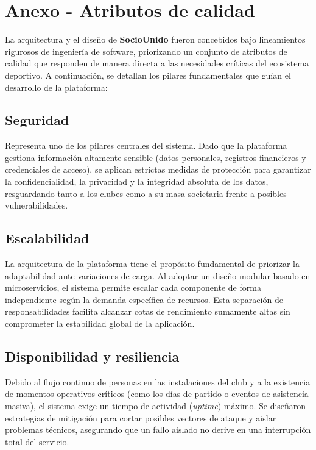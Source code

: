 \section{Anexo - Atributos de calidad}

La arquitectura y el diseño de \textbf{SocioUnido} fueron concebidos bajo lineamientos rigurosos de ingeniería de software, priorizando un conjunto de atributos de calidad que responden de manera directa a las necesidades críticas del ecosistema deportivo. A continuación, se detallan los pilares fundamentales que guían el desarrollo de la plataforma:

\subsection{Seguridad}

Representa uno de los pilares centrales del sistema. Dado que la plataforma gestiona información altamente sensible (datos personales, registros financieros y credenciales de acceso), se aplican estrictas medidas de protección para garantizar la confidencialidad, la privacidad y la integridad absoluta de los datos, resguardando tanto a los clubes como a su masa societaria frente a posibles vulnerabilidades.

\subsection{Escalabilidad}

La arquitectura de la plataforma tiene el propósito fundamental de priorizar la adaptabilidad ante variaciones de carga. Al adoptar un diseño modular basado en microservicios, el sistema permite escalar cada componente de forma independiente según la demanda específica de recursos. Esta separación de responsabilidades facilita alcanzar cotas de rendimiento sumamente altas sin comprometer la estabilidad global de la aplicación.

\subsection{Disponibilidad y resiliencia}

Debido al flujo continuo de personas en las instalaciones del club y a la existencia de momentos operativos críticos (como los días de partido o eventos de asistencia masiva), el sistema exige un tiempo de actividad (\textit{uptime}) máximo. Se diseñaron estrategias de mitigación para cortar posibles vectores de ataque y aislar problemas técnicos, asegurando que un fallo aislado no derive en una interrupción total del servicio.

